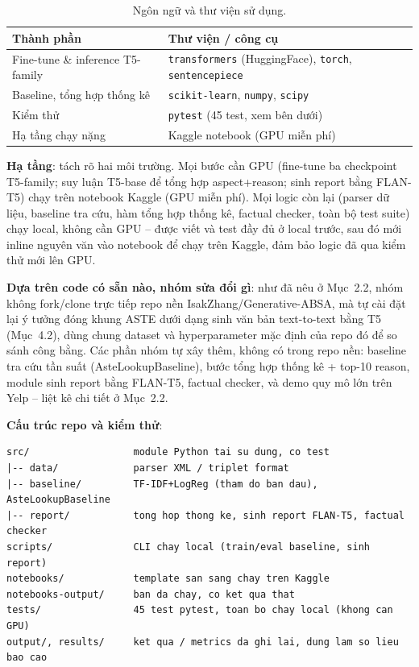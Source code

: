 \documentclass[11pt,a4paper]{article}
\begin{document}
\begin{table}[h]
\centering
\begin{tabular}{ll}
\toprule
Thành phần & Thư viện / công cụ \\
\midrule
Fine-tune \& inference T5-family & \texttt{transformers} (HuggingFace), \texttt{torch}, \texttt{sentencepiece} \\
Baseline, tổng hợp thống kê & \texttt{scikit-learn}, \texttt{numpy}, \texttt{scipy} \\
Kiểm thử & \texttt{pytest} (45 test, xem bên dưới) \\
Hạ tầng chạy nặng & Kaggle notebook (GPU miễn phí) \\
\bottomrule
\end{tabular}
\caption{Ngôn ngữ và thư viện sử dụng.}
\end{table}

\textbf{Hạ tầng}: tách rõ hai môi trường. Mọi bước cần GPU (fine-tune ba
checkpoint T5-family; suy luận T5-base để tổng hợp aspect+reason; sinh
report bằng FLAN-T5) chạy trên notebook Kaggle (GPU miễn phí). Mọi logic
còn lại (parser dữ liệu, baseline tra cứu, hàm tổng hợp thống kê, factual
checker, toàn bộ test suite) chạy local, không cần GPU -- được viết và
test đầy đủ ở local trước, sau đó mới inline nguyên văn vào notebook để
chạy trên Kaggle, đảm bảo logic đã qua kiểm thử mới lên GPU.

\textbf{Dựa trên code có sẵn nào, nhóm sửa đổi gì}: như đã nêu ở
Mục~2.2, nhóm không fork/clone trực tiếp repo nền
IsakZhang/Generative-ABSA, mà tự cài đặt lại ý tưởng đóng khung ASTE dưới
dạng sinh văn bản text-to-text bằng T5 (Mục~4.2), dùng chung dataset và
hyperparameter mặc định của repo đó để so sánh công bằng. Các phần nhóm
tự xây thêm, không có trong repo nền: baseline tra cứu tần suất
(AsteLookupBaseline), bước tổng hợp thống kê + top-10 reason, module sinh
report bằng FLAN-T5, factual checker, và demo quy mô lớn trên Yelp --
liệt kê chi tiết ở Mục~2.2.

\textbf{Cấu trúc repo và kiểm thử}:

\begin{verbatim}
src/                  module Python tai su dung, co test
|-- data/             parser XML / triplet format
|-- baseline/         TF-IDF+LogReg (tham do ban dau), AsteLookupBaseline
|-- report/           tong hop thong ke, sinh report FLAN-T5, factual checker
scripts/              CLI chay local (train/eval baseline, sinh report)
notebooks/            template san sang chay tren Kaggle
notebooks-output/     ban da chay, co ket qua that
tests/                45 test pytest, toan bo chay local (khong can GPU)
output/, results/     ket qua / metrics da ghi lai, dung lam so lieu bao cao
\end{verbatim}
\end{document}
